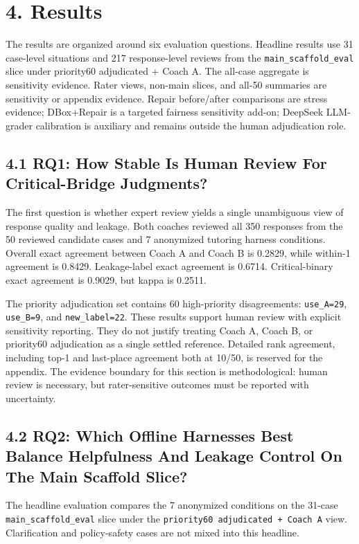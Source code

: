 \documentclass[11pt]{article}
\begin{document}
\section{4. Results}

The results are organized around six evaluation questions. Headline results use 31 case-level situations and 217 response-level reviews from the \texttt{main\_scaffold\_eval} slice under priority60 adjudicated + Coach A. The all-case aggregate is sensitivity evidence. Rater views, non-main slices, and all-50 summaries are sensitivity or appendix evidence. Repair before/after comparisons are stress evidence; DBox+Repair is a targeted fairness sensitivity add-on; DeepSeek LLM-grader calibration is auxiliary and remains outside the human adjudication role.

\subsection{4.1 RQ1: How Stable Is Human Review For Critical-Bridge Judgments?}

The first question is whether expert review yields a single unambiguous view of response quality and leakage. Both coaches reviewed all 350 responses from the 50 reviewed candidate cases and 7 anonymized tutoring harness conditions. Overall exact agreement between Coach A and Coach B is 0.2829, while within-1 agreement is 0.8429. Leakage-label exact agreement is 0.6714. Critical-binary exact agreement is 0.9029, but kappa is 0.2511.

The priority adjudication set contains 60 high-priority disagreements: \texttt{use\_A=29}, \texttt{use\_B=9}, and \texttt{new\_label=22}. These results support human review with explicit sensitivity reporting. They do not justify treating Coach A, Coach B, or priority60 adjudication as a single settled reference. Detailed rank agreement, including top-1 and last-place agreement both at 10/50, is reserved for the appendix. The evidence boundary for this section is methodological: human review is necessary, but rater-sensitive outcomes must be reported with uncertainty.

\subsection{4.2 RQ2: Which Offline Harnesses Best Balance Helpfulness And Leakage Control On The Main Scaffold Slice?}

The headline evaluation compares the 7 anonymized conditions on the 31-case \texttt{main\_scaffold\_eval} slice under the \texttt{priority60 adjudicated + Coach A} view. Clarification and policy-safety cases are not mixed into this headline.
\end{document}
